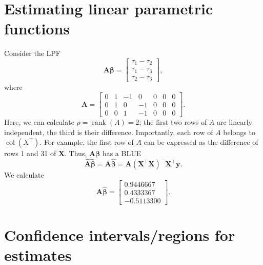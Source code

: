 \documentclass[10pt]{article}
\renewcommand{\vec}{\bm}
\DeclareMathOperator{\rank}{rank}
\DeclareMathOperator{\col}{col}
\begin{document}
    \section{Estimating linear parametric functions}

    Consider the LPF \[
        \vec{A}\vec{\beta} = \begin{bmatrix}
            \tau_1 - \tau_2 \\
            \tau_1 - \tau_3 \\
            \tau_2 - \tau_3
        \end{bmatrix},
    \] where \[
        \vec{A} = \begin{bmatrix}
            0 & 1 & -1 & 0  & 0 & 0 & 0 \\
            0 & 1 &  0 & -1 & 0 & 0 & 0 \\
            0 & 0 &  1 & -1 & 0 & 0 & 0
        \end{bmatrix}.
    \] Here, we can calculate $\rho = \rank(A) = 2$; the first two rows of $A$ are
    linearly independent, the third is their difference. Importantly, each row of $A$
    belongs to $\col(X^\top)$. For example, the first row of $A$ can be expressed as
    the difference of rows 1 and 31 of $\vec{X}$. Thus, $\vec{A}\vec{\beta}$ has a
    BLUE \[
        \widehat{\vec{A}\vec{\beta}} = \vec{A}\hat{\vec{\beta}} =
        \vec{A}(\vec{X}^\top \vec{X})^- \vec{X}^\top \vec{y}.
    \] We calculate \[
        \vec{A}\hat{\vec{\beta}} = \begin{bmatrix}
            0.9446667 \\
            0.4333367 \\
            -0.5113300
        \end{bmatrix}.
    \]

    \section{Confidence intervals/regions for estimates}
\end{document}
